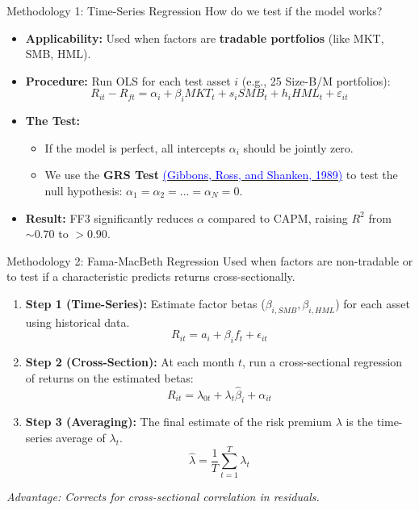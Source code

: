 \documentclass{beamer}
\begin{document}
\begin{frame}{Methodology 1: Time-Series Regression}
	How do we test if the model works?
	
	\begin{itemize}
		\item \textbf{Applicability:} Used when factors are \textbf{tradable portfolios} (like MKT, SMB, HML).
		\item \textbf{Procedure:} Run OLS for each test asset $i$ (e.g., 25 Size-B/M portfolios):
		$$ R_{it} - R_{ft} = \alpha_i + \beta_i MKT_t + s_i SMB_t + h_i HML_t + \varepsilon_{it} $$
		\item \textbf{The Test:}
		\begin{itemize}
			\item If the model is perfect, all intercepts $\alpha_i$ should be jointly zero.
			\item We use the \textbf{GRS Test} \href{Gibbons, Ross, and Shanken, 1989)}{\textcolor{blue}{(Gibbons, Ross, and Shanken, 1989)}} to test the null hypothesis: $\alpha_1 = \alpha_2 = ... = \alpha_N = 0$.
		\end{itemize}
		\item \textbf{Result:} FF3 significantly reduces $\alpha$ compared to CAPM, raising $R^2$ from $\sim 0.70$ to $>0.90$.
	\end{itemize}
\end{frame}

\begin{frame}{Methodology 2: Fama-MacBeth Regression}
	Used when factors are non-tradable or to test if a characteristic predicts returns cross-sectionally.
	
	\begin{enumerate}
		\item \textbf{Step 1 (Time-Series):} Estimate factor betas ($\beta_{i,SMB}, \beta_{i,HML}$) for each asset using historical data.
		$$ R_{it} = a_i + \beta_i f_t + \epsilon_{it} $$
		\item \textbf{Step 2 (Cross-Section):} At each month $t$, run a cross-sectional regression of returns on the estimated betas:
		$$ R_{it} = \lambda_{0t} + \lambda_{t} \hat{\beta}_{i} + \alpha_{it} $$
		\item \textbf{Step 3 (Averaging):} The final estimate of the risk premium $\lambda$ is the time-series average of $\lambda_t$.
		$$ \hat{\lambda} = \frac{1}{T} \sum_{t=1}^{T} \lambda_t $$
	\end{enumerate}
	\textit{Advantage: Corrects for cross-sectional correlation in residuals.}
\end{frame}
\end{document}
